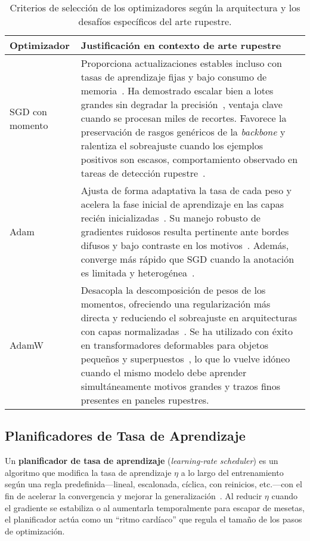 \begin{table}[htpb]
    \centering
    \begin{tabular}{p{3.2cm} p{10.5cm}}
        \hline
        \textbf{Optimizador} & \textbf{Justificación en contexto de arte rupestre} \\
        \hline
        SGD con momento &
        Proporciona actualizaciones estables incluso con tasas de aprendizaje fijas y bajo consumo de memoria~\cite{robbins1951stochastic,qian1999momentum}.
        Ha demostrado escalar bien a lotes grandes sin degradar la precisión~\cite{goyal2017}, ventaja clave cuando se procesan miles de recortes.
        Favorece la preservación de rasgos genéricos de la \emph{backbone} y ralentiza el sobreajuste cuando los ejemplos positivos son escasos, comportamiento observado en tareas de detección rupestre~\cite{suhaimi2023}. \\[0.3em]

        Adam &
        Ajusta de forma adaptativa la tasa de cada peso y acelera la fase inicial de aprendizaje en las capas recién inicializadas~\cite{kingma2015adam}.
        Su manejo robusto de gradientes ruidosos resulta pertinente ante bordes difusos y bajo contraste en los motivos~\cite{horn2022ai,jalandoni2022}.
        Además, converge más rápido que SGD cuando la anotación es limitada y heterogénea~\cite{goodfellow2016deep}. \\[0.3em]

        AdamW &
        Desacopla la descomposición de pesos de los momentos, ofreciendo una regularización más directa y reduciendo el sobreajuste en arquitecturas con capas normalizadas~\cite{loshchilov2019adamw}.
        Se ha utilizado con éxito en transformadores deformables para objetos pequeños y superpuestos~\cite{zhu2021,smallobjDETR}, lo que lo vuelve idóneo cuando el mismo modelo debe aprender simultáneamente motivos grandes y trazos finos presentes en paneles rupestres. \\
    \end{tabular}
    \caption{Criterios de selección de los optimizadores según la arquitectura y los desafíos específicos del arte rupestre.}
    \label{tab:optimizadores}
\end{table}


\subsection{Planificadores de Tasa de Aprendizaje}

Un \textbf{planificador de tasa de aprendizaje} (\emph{learning‐rate scheduler}) es un algoritmo que modifica la tasa de aprendizaje \(\eta\) a lo largo del entrenamiento según una regla predefinida—lineal, escalonada, cíclica, con reinicios, etc.—con el fin de acelerar la convergencia y mejorar la generalización~\cite{loshchilov2017,smith2019}.
Al reducir \(\eta\) cuando el gradiente se estabiliza o al aumentarla temporalmente para escapar de mesetas, el planificador actúa como un “ritmo cardíaco” que regula el tamaño de los pasos de optimización.

